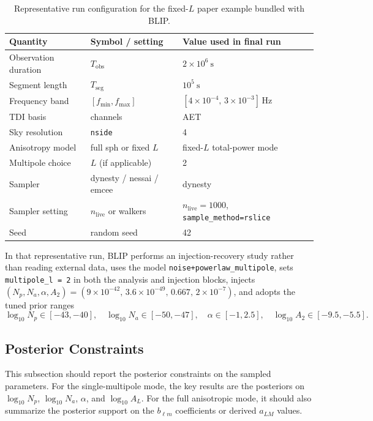 \documentclass[11pt]{article}
\begin{document}
\begin{table}[H]
\centering
\caption{Representative run configuration for the fixed-$L$ paper example bundled with BLIP.}
\label{tab:runconfig}
\begin{tabular}{lll}
\toprule
Quantity & Symbol / setting & Value used in final run \\
\midrule
Observation duration & $T_{\mathrm{obs}}$ & $2\times10^6\ \mathrm{s}$ \\
Segment length & $T_{\mathrm{seg}}$ & $10^5\ \mathrm{s}$ \\
Frequency band & $[f_{\min},f_{\max}]$ & $[4\times10^{-4},\,3\times10^{-3}]\,\mathrm{Hz}$ \\
TDI basis & channels & AET \\
Sky resolution & \texttt{nside} & 4 \\
Anisotropy model & full sph or fixed $L$ & fixed-$L$ total-power mode \\
Multipole choice & $L$ (if applicable) & 2 \\
Sampler & dynesty / nessai / emcee & dynesty \\
Sampler setting & $n_{\mathrm{live}}$ or walkers & $n_{\mathrm{live}}=1000$, \texttt{sample\_method=rslice} \\
Seed & random seed & 42 \\
\bottomrule
\end{tabular}
\end{table}

In that representative run, BLIP performs an injection-recovery study rather than reading external data, uses the model \texttt{noise+powerlaw\_multipole}, sets \texttt{multipole\_l = 2} in both the analysis and injection blocks, injects $(N_p, N_a, \alpha, A_2)=(9\times10^{-42},\,3.6\times10^{-49},\,0.667,\,2\times10^{-7})$, and adopts the tuned prior ranges
\begin{equation}
\log_{10}N_p\in[-43,-40],\quad
\log_{10}N_a\in[-50,-47],\quad
\alpha\in[-1,2.5],\quad
\log_{10}A_2\in[-9.5,-5.5].
\end{equation}

\subsection{Posterior Constraints}
This subsection should report the posterior constraints on the sampled parameters. For the single-multipole mode, the key results are the posteriors on $\log_{10}N_p$, $\log_{10}N_a$, $\alpha$, and $\log_{10}A_L$. For the full anisotropic mode, it should also summarize the posterior support on the $b_{\ell m}$ coefficients or derived $a_{LM}$ values.
\end{document}
